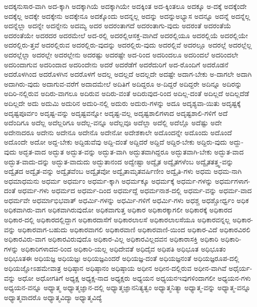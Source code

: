 {ಅದಕ್ಕನುಸಾರ-ವಾಗಿ
ಅದ-ಕ್ಕಾಗಿ
ಅದಕ್ಕಾಗಿಯೆ
ಅದಕ್ಕಾಗಿಯೇ
ಅದಕ್ಕಿಂತ
ಅದ-ಕ್ಕಿಂತಲೂ
ಅದಕ್ಕೂ
ಅ-ದಕ್ಕೆ
ಅದಕ್ಕೆಂದೇ
ಅದಕ್ಕೆಲ್ಲ
ಅದಕ್ಕೇ
ಅದಕ್ಕೇನು
ಅದಕ್ಕೇನೂ
ಅದಕ್ಕೊಂದು
ಅದನ್ನಲ್ಲ
ಅದನ್ನು
ಅದನ್ನುಅಭ್ಯಾಸ
ಅದನ್ನೂ
ಅದನ್ನೆ
ಅದನ್ನೆಲ್ಲ
ಅದನ್ನೆಲ್ಲಾ
ಅದನ್ನೇ
ಅದನ್ನೇನು
ಅದಮ್ಯ
ಅದರ
ಅದರಂತಾಗದೆ
ಅದರಂತಾಗು-ವುದು
ಅದರಂತೆ
ಅದರಂತೆಯೆ
ಅದರಂತೆಯೇ
ಅದರದರ
ಅದರಮೇಲೆ
ಅದ-ರಲ್ಲಿ
ಅದರಲ್ಲಿಆಸಕ್ತ-ವಾಗಿದೆ
ಅದರಲ್ಲಿಯೂ
ಅದರಲ್ಲಿಯೆ
ಅದರಲ್ಲಿಯೇ
ಅದರಲ್ಲಿರು-ತ್ತವೆ
ಅದರಲ್ಲಿರುವ
ಅದರಲ್ಲಿರು-ವುದನ್ನು
ಅದರಲ್ಲಿರು-ವುದು
ಅದರಲ್ಲಿವೆ
ಅದರಲ್ಲೂ
ಅದರಲ್ಲೆ
ಅದರಲ್ಲೆಲ್ಲ
ಅದರಲ್ಲೆಲ್ಲಾ
ಅದರಲ್ಲೇ
ಅದರಲ್ಲೇನು
ಅದರಷ್ಟು
ಅದರಷ್ಟೇ
ಅದ-ರಿಂದ
ಅದರಿಂದಲೂ
ಅದರಿಂದಲೆ
ಅದರಿಂದಲೇ
ಅದರಿಂದಾಗುವ
ಅದರಿಂದಾದ
ಅದರಿಂದೇನು
ಅದರೆ
ಅದರೆಡೆಗೆ
ಅದರೆದುರಿಗೆ
ಅದ-ರೊಂದಿಗೆ
ಅದರೊಡನೆ
ಅದರೊಳಗಿಂದ
ಅದರೊಳಗಿನ
ಅದರೊಳಗೆ
ಅದಲ್ಲ
ಅದಲ್ಲದೆ
ಅದಲ್ಲದೇ
ಅದಷ್ಟೇ
ಅದಾಗ-ಬೇಕು
ಅ-ದಾಗಲೇ
ಅದಾಗಿ
ಅದಾಗಿರು-ವುದು
ಅದಾಗುವ-ವರೆಗೆ
ಅದಾದಮೇಲೆ
ಅದಿತಿಗೆ
ಅದಿದ್ದರೂ
ಅ-ದಿದ್ದರೆ
ಅದಿದ್ದರೇ
ಅದಿನ್ನೂ
ಅದಿರನ್ನು
ಅದಿರಿ-ನಲ್ಲಿರುವ
ಅದಿರು-ವಾಗಲೂ
ಅದಿರುವ
ಅದಿರು-ವಂತೆ
ಅದಿರುವುದ-ರಿಂದ
ಅದಿಲ್ಲ-ದಂತೆ
ಅದಿಲ್ಲದೆ
ಅದಿಲ್ಲದೆಡೆ
ಅದಿಲ್ಲದೇ
ಅದು
ಅದುಮಿ
ಅದುರಿನ
ಅದುರಿ-ನಲ್ಲಿ
ಅದುರು
ಅದುರು-ಗಳನ್ನು
ಅದೂ
ಅದೃಶ್ಯವಾ-ಯಿತು
ಅದೃಷ್ಟಕ್ಕೆ
ಅದೃಷ್ಟಪೂರ್ವಂ
ಅದೃಷ್ಟ-ವನ್ನು
ಅದೃಷ್ಟವನ್ನೋ
ಅದೃಷ್ಟ-ವಲ್ಲ
ಅದೃಷ್ಟಶಾಲಿಗಳಾದ
ಅದೃಷ್ಟಶಾಲಿ-ಗಳಿಗೆ
ಅದೆ
ಅದೆಂದಿಗೂ
ಅದೆಲ್ಲ
ಅದೆಲ್ಲರಿಗೂ
ಅದೆಲ್ಲ-ವನ್ನೂ
ಅದೆಲ್ಲವೂ
ಅದೆಲ್ಲಾ
ಅದೆಲ್ಲಿ
ಅದೆಲ್ಲೊ
ಅದೆಷ್ಟು
ಅದೇ
ಅದೇನಾದರೂ
ಅದೇನು
ಅದೇನೂ
ಅದೇನೊ
ಅದೇನೋ
ಅದೇಶಕಾಲೇ
ಅದೊಂದನ್ನೇ
ಅದೊಂದು
ಅದೊಂದೆ
ಅದೊಂದೇ
ಅದೋ
ಅದ್ದ-ಬೇಕು
ಅದ್ದಿಡುವೆವು
ಅದ್ದಿ-ದಂತೆ
ಅದ್ದಿದರೆ
ಅದ್ದಿದೆ
ಅದ್ದಿರ-ಬೇಕು
ಅದ್ದಿರು-ವುದು
ಅದ್ದು-ವುದು
ಅದ್ಭತ-ವಾದ
ಅದ್ಭುತ
ಅದ್ಭುತ-ವನ್ನು
ಅದ್ಭುತ-ವಾಗಿ
ಅದ್ಭುತವಾಗಿದ್ದರೂ
ಅದ್ಭುತವಾಗಿ-ಬೇಕು
ಅದ್ಭುತ-ವಾದ
ಅದ್ಭುತ-ವಾದು-ದನ್ನು
ಅದ್ಭುತ-ವಾದುದು
ಅದ್ಭುತಾನಂದ
ಅದ್ವೇಷ್ಟಾ
ಅದ್ವೈತ
ಅದ್ವೈತಗಳೆಂಬ
ಅದ್ವೈತತತ್ತ್ವ-ವನ್ನು
ಅದ್ವೈತದ
ಅದ್ವೈತ-ವನ್ನು
ಅದ್ವೈತವೆಂಬ
ಅದ್ವೈತವೋ
ಅದ್ವೈತಾಮೃತವರ್ಷಿಣೀಂ
ಅದ್ವೈತಿ-ಗಳು
ಅಧಮ
ಅಧಮ-ನಾಗಿ
ಅಧಮಾಧಮನು
ಅಧರ್ಮ
ಅಧರ್ಮಂ
ಅಧರ್ಮ-ಕ್ಕಾಗಿ
ಅಧರ್ಮಕ್ಕೂ
ಅಧರ್ಮಕ್ಕೆ
ಅಧರ್ಮ-ಗಳನ್ನು
ಅಧರ್ಮಗಳಾಗ-ದಂತೆ
ಅಧರ್ಮ-ಗಳು
ಅಧರ್ಮದ
ಅಧರ್ಮ-ದಿಂದ
ಅಧರ್ಮದ್ದೆ
ಅಧರ್ಮನಾಶ-ದಲ್ಲಿ
ಅಧರ್ಮ-ವನ್ನು
ಅಧರ್ಮ-ವಾದ
ಅಧರ್ಮವೇ
ಅಧರ್ಮಾಭಿಭವಾತ್
ಅಧರ್ಮಿ-ಗಳನ್ನು
ಅಧರ್ಮಿ-ಗಳಿಗೆ
ಅಧರ್ಮಿ-ಗಳು
ಅಧಶ್ಚ
ಅಧಶ್ಚೋರ್ಧ್ವಂ
ಅಧಿಕ
ಅಧಿಕವಾಗಿರು-ವಾಗ
ಅಧಿಕವಾಗಿರುವುದೋ
ಅಧಿಕವಾಗುತ್ತ
ಅಧಿಕಾರ
ಅಧಿಕಾರಕ್ಕಾಗಲೀ
ಅಧಿಕಾರಕ್ಕೆ
ಅಧಿಕಾರದ
ಅಧಿಕಾರ-ದಲ್ಲಿ
ಅಧಿಕಾರದಲ್ಲಿದ್ದಾಗ
ಅಧಿಕಾರದಾಸೆಗೆ
ಅಧಿಕಾರಲಾಲಸೆ
ಅಧಿಕಾರಲಾಲಸೆಯೂ
ಅಧಿಕಾರವನ್ನಲ್ಲ
ಅಧಿಕಾರ-ವನ್ನು
ಅಧಿಕಾರವಾಗ-ಬಹುದು
ಅಧಿಕಾರವಾಗಲಿ
ಅಧಿಕಾರವಾಣಿ
ಅಧಿಕಾರವಾಣಿ-ಯಿಂದ
ಅಧಿಕಾರ-ವಿದೆ
ಅಧಿಕಾರವಿರಲಿ
ಅಧಿಕಾರವಿರು-ವಾಗ
ಅಧಿಕಾರವಿರುವುದೊ
ಅಧಿಕಾರ-ವಿಲ್ಲ
ಅಧಿಕಾರವಿಲ್ಲದವನ
ಅಧಿಕಾರಾಸಕ್ತಿ
ಅಧಿಕಾರಿ
ಅಧಿಕಾರಿ-ಗಳನ್ನು
ಅಧಿಕಾರಿಗಳಾದವ-ರಿಂದ
ಅಧಿಕಾರಿ-ಯಲ್ಲ
ಅಧಿದೇವತೆ
ಅಧಿದೈವ
ಅಧಿಪತಿ
ಅಧಿಭೂತ
ಅಧಿಭೂತಂ
ಅಧಿಭೂತಈ
ಅಧಿಯಜ್ಞ
ಅಧಿಯಜ್ಞಃ
ಅಧಿಯಜ್ಞಎಂದರೆ
ಅಧಿಯಜ್ಞ-ದಂತೆ
ಅಧಿಯಜ್ಞನಂತೆ
ಅಧಿಯಜ್ಞರೂಪ-ದಲ್ಲಿ
ಅಧಿಯಜ್ಞೋಽಹಮೇವಾತ್ರ
ಅಧಿಷ್ಠಾನ
ಅಧಿಷ್ಠಾನಂ
ಅಧಿಷ್ಠಾಯ
ಅಧೀನ
ಅಧೀನ-ದಲ್ಲಿರುವ
ಅಧೀನ-ವಾಗಿವೆ
ಅಧೈರ್ಯ-ವನ್ನು
ಅಧೋ
ಅಧೋಗತಿಗೆ
ಅಧ್ಯಕ್ಷ
ಅಧ್ಯಕ್ಷ-ನಾದ
ಅಧ್ಯಕ್ಷರು
ಅಧ್ಯಯನ
ಅಧ್ಯಯನಇವುಗಳಿಂದಾಗಲೀ
ಅಧ್ಯಯನ-ಗಳು
ಅಧ್ಯಯನ-ವನ್ನೂ
ಅಧ್ಯಾತ್ಮ
ಅಧ್ಯಾತ್ಮಜ್ಞಾನ-ದಲ್ಲಿ
ಅಧ್ಯಾತ್ಮಜ್ಞಾನನಿತ್ಯತ್ವಂ
ಅಧ್ಯಾತ್ಮನಿತ್ಯಾ
ಅಧ್ಯಾತ್ಮ-ವನ್ನು
ಅಧ್ಯಾತ್ಮ-ವನ್ನೂ
ಅಧ್ಯಾತ್ಮವಾದರೊ
ಅಧ್ಯಾತ್ಮವಿದ್ಯಾ
ಅಧ್ಯಾತ್ಮವಿದ್ಯೆ
}
